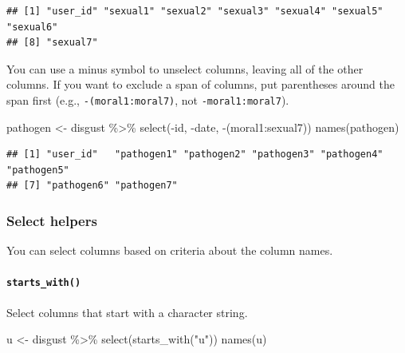 \documentclass[
  oneside]{book}
\newenvironment{Shaded}{\begin{snugshade}}{\end{snugshade}}
\newcommand{\FunctionTok}[1]{\textcolor[rgb]{0.00,0.00,0.00}{#1}}
\newcommand{\NormalTok}[1]{#1}
\newcommand{\OtherTok}[1]{\textcolor[rgb]{0.56,0.35,0.01}{#1}}
\newcommand{\SpecialCharTok}[1]{\textcolor[rgb]{0.00,0.00,0.00}{#1}}
\newcommand{\StringTok}[1]{\textcolor[rgb]{0.31,0.60,0.02}{#1}}
\begin{document}
\begin{verbatim}
## [1] "user_id" "sexual1" "sexual2" "sexual3" "sexual4" "sexual5" "sexual6"
## [8] "sexual7"
\end{verbatim}

You can use a minus symbol to unselect columns, leaving all of the other columns. If you want to exclude a span of columns, put parentheses around the span first (e.g., \texttt{-(moral1:moral7)}, not \texttt{-moral1:moral7}).

\begin{Shaded}
\begin{Highlighting}[]
\NormalTok{pathogen }\OtherTok{\textless{}{-}}\NormalTok{ disgust }\SpecialCharTok{\%\textgreater{}\%} \FunctionTok{select}\NormalTok{(}\SpecialCharTok{{-}}\NormalTok{id, }\SpecialCharTok{{-}}\NormalTok{date, }\SpecialCharTok{{-}}\NormalTok{(moral1}\SpecialCharTok{:}\NormalTok{sexual7))}
\FunctionTok{names}\NormalTok{(pathogen)}
\end{Highlighting}
\end{Shaded}

\begin{verbatim}
## [1] "user_id"   "pathogen1" "pathogen2" "pathogen3" "pathogen4" "pathogen5"
## [7] "pathogen6" "pathogen7"
\end{verbatim}

\hypertarget{select_helpers}{%
\subsubsection{Select helpers}\label{select_helpers}}

You can select columns based on criteria about the column names.

\hypertarget{starts_with}{%
\paragraph{\texorpdfstring{\texttt{starts\_with()}}{starts\_with()}}\label{starts_with}}

Select columns that start with a character string.

\begin{Shaded}
\begin{Highlighting}[]
\NormalTok{u }\OtherTok{\textless{}{-}}\NormalTok{ disgust }\SpecialCharTok{\%\textgreater{}\%} \FunctionTok{select}\NormalTok{(}\FunctionTok{starts\_with}\NormalTok{(}\StringTok{"u"}\NormalTok{))}
\FunctionTok{names}\NormalTok{(u)}
\end{Highlighting}
\end{Shaded}
\end{document}
